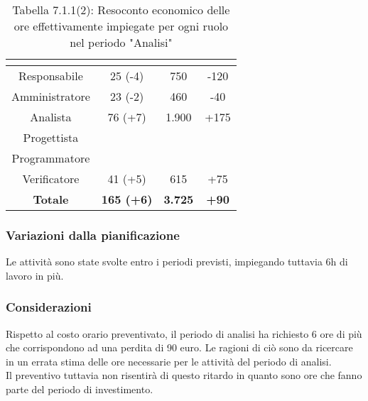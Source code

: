 \renewcommand{\arraystretch}{1.4}
\begin{table}[H]
\begin{center}
\begin{tabular}{|c|c|c|c|}
\hline
\rowcolor{title_row}
\textbf{\color{title_text}{Ruolo}}  & \textbf{\color{title_text}{Ore}} & \textbf{\color{title_text}{Costo in \euro}} & \textbf{\color{title_text}{Differenza al preventivo in \euro}} \\ \hline
Responsabile    & 25 (-4) & 750 & -120 \\ \hline
Amministratore  & 23 (-2) & 460 & -40 \\ \hline
Analista        & 76 (+7) & 1.900 & +175 \\ \hline
Progettista     & & &  \\ \hline
Programmatore   & & &  \\ \hline
Verificatore    & 41 (+5) & 615 & +75  \\ \hline
\textbf{Totale} & \textbf{165 (+6)}    & \textbf{3.725} & \textbf{+90} \\ \hline
\end{tabular}
\caption{Tabella 7.1.1(2): Resoconto economico delle ore effettivamente impiegate per ogni ruolo nel periodo "Analisi"\label{}}
\end{center}
\end{table}
\renewcommand{\arraystretch}{1}


\subsubsection{Variazioni dalla pianificazione}
Le attività sono state svolte entro i periodi previsti, impiegando tuttavia 6h di lavoro in più.

\subsubsection{Considerazioni}
Rispetto al costo orario preventivato, il periodo di analisi ha richiesto 6 
ore di più che corrispondono ad una perdita di 90 euro. Le ragioni di ciò sono
da ricercare in un errata stima delle ore necessarie per le attività del periodo di analisi. \\
Il preventivo tuttavia non risentirà di questo ritardo in quanto sono ore che fanno parte del periodo di investimento.

\pagebreak
